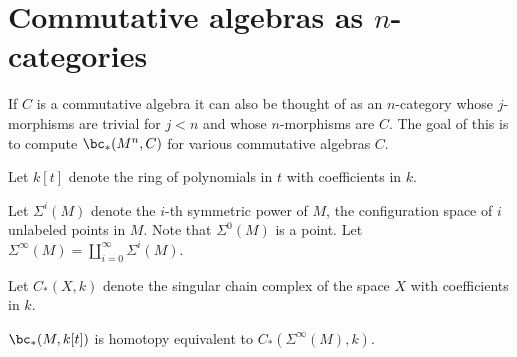 
\section{Commutative algebras as $n$-categories}
\label{sec:comm_alg}




If $C$ is a commutative algebra it
can also be thought of as an $n$-category whose $j$-morphisms are trivial for
$j<n$ and whose $n$-morphisms are $C$. 
The goal of this  is to compute
$\bc_*(M^n, C)$ for various commutative algebras $C$.

\medskip

Let $k[t]$ denote the ring of polynomials in $t$ with coefficients in $k$.

Let $\Sigma^i(M)$ denote the $i$-th symmetric power of $M$, the configuration space of $i$
unlabeled points in $M$.
Note that $\Sigma^0(M)$ is a point.
Let $\Sigma^\infty(M) = \coprod_{i=0}^\infty \Sigma^i(M)$.

Let $C_*(X, k)$ denote the singular chain complex of the space $X$ with coefficients in $k$.

\begin{prop} \label{sympowerprop}
$\bc_*(M, k[t])$ is homotopy equivalent to $C_*(\Sigma^\infty(M), k)$.
\end{prop}

